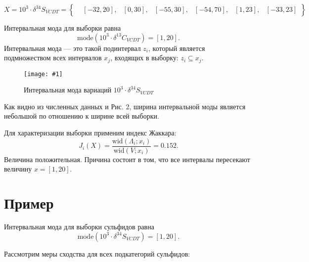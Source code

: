 \documentclass[a4paper,12pt]{article}
\newcommand{\plot}[3]{
    \begin{figure}[H]
        \begin{center}
            \texttt{[image: \#1]}
            \caption{#2}
            \label{#3}
        \end{center}
    \end{figure}
}
\begin{document}
    \[
    X = 10^3 \cdot \delta^{34}S_{VCDT} = \left\{
    \begin{aligned}
    &[-32, 20], &[0, 30], &[-55, 30], &[-54, 70], &[1, 23], &[-33, 23]
    \end{aligned}
    \right\}
    \]

    Интервальная мода для выборки равна
    \[
    \text{mode}(10^3 \cdot \delta^{13}C_{VCDT}) = [1, 20].
    \]
    Интервальная мода — это такой подинтервал \(z_i\), который является подмножеством всех интервалов \(x_j\), входящих в выборку: \(z_i \subseteq x_j\).
    \plot{sulfide_mode}{Интервальная мода вариаций \(10^3 \cdot \delta^{34}S_{VCDT}\)}{p:sulfide_mod}

    Как видно из численных данных и Рис. 2, ширина интервальной моды является небольшой по отношению к ширине всей выборки.

    Для характеризации выборки применим индекс Жаккара:
    \[
    J_i(X) = \frac{\text{wid}(\Lambda_i; x_i)}{\text{wid}(V; x_i)} = 0.152.
    \]
    Величина положительная. Причина состоит в том, что все интервалы пересекают величину \( x = [1, 20] \).

    \section{Пример}
    Интервальная мода для выборки сульфидов равна
    \[
    \text{mode}(10^3 \cdot \delta^{34}S_{VCDT}) = [1, 20].
    \]

    Рассмотрим меры сходства для всех подкатегорий сульфидов:
\end{document}
